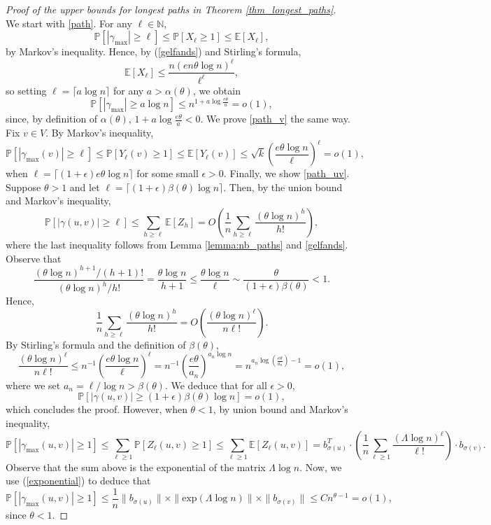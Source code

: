 \documentclass[11pt]{article}
\numberwithin{equation}{section}
\theoremstyle{definition}
\newcommand\bE{{\mathbb E}}
\newcommand\bN{{\mathbb N}}
\newcommand\bP{{\mathbb P}}
\begin{document}
\begin{proof}[Proof of the upper bounds for longest paths in Theorem \ref{thm_longest_paths}]\hfill \\
We start with \ref{path}. For any $\ell \in \bN$,
$$\bP[|\gamma_{\max}|\geq \ell] \leq \bP[X_\ell \geq 1] \leq \bE[X_\ell], $$
by Markov's inequality. Hence, by (\ref{gelfands}) and Stirling's formula,
$$\bE[X_\ell] \leq \frac{n(en \theta\log n)^\ell}{\ell^\ell}, $$
so setting $\ell = \lceil a \log n\rceil$ for any $a > \alpha(\theta)$, we obtain
$$\bP[|\gamma_{\max}|\geq a \log n] \leq n^{1+a\log \frac{e\theta}{a}}= o(1), $$
since, by definition of $\alpha(\theta)$, $1+a\log\frac{e\theta}{a}<0 $. We prove \ref{path_v} the same way. Fix $v \in V$. By Markov's inequality,
$$\bP[|\gamma_{\max}(v)|\geq \ell] \leq \bP[Y_\ell(v) \geq 1] \leq \bE[Y_\ell(v)] \leq \sqrt{k} \left(\frac{e\theta\log n}{\ell}\right)^\ell = o(1),$$
when $\ell = \lceil (1+\epsilon)e\theta\log n \rceil$ for some small $\epsilon > 0$. Finally, we show \ref{path_uv}. Suppose $\theta > 1$ and let $\ell = \lceil (1+\epsilon)\beta(\theta)\log n \rceil$. Then, by the union bound and Markov's inequality,
$$\bP[|\gamma(u,v)|\geq \ell] \leq \sum_{h\geq \ell} \bE[Z_h] = O\left( \frac{1}{n}\sum_{h\geq \ell} \frac{(\theta \log n)^h}{h!} \right), $$
where the last inequality follows from Lemma \ref{lemma:nb_paths} and \eqref{gelfands}. Observe that
$$\frac{(\theta\log n)^{h+1}/(h+1)!}{(\theta\log n)^h/h!} = \frac{\theta\log n}{h+1} \leq \frac{\theta\log n}{\ell}\sim\frac{\theta}{(1+\epsilon)\beta(\theta)}<1. $$
Hence,
$$\frac{1}{n}\sum_{h\geq \ell} \frac{(\theta \log n)^h}{h!} = O\left( \frac{(\theta \log n)^\ell}{n \ell!} \right) . $$
By Stirling's formula and the definition of $\beta(\theta)$,
$$\frac{(\theta \log n)^\ell}{n \ell!} \leq n^{-1}\left(\frac{e\theta \log n }{\ell} \right)^\ell = n^{-1} \left(\frac{e\theta}{a_n} \right)^{a_n \log n} = n^{a_n\log\left(\frac{e\theta}{a_n}\right)-1} = o(1),  $$
where we set $a_n = \ell / \log n > \beta(\theta)$. We deduce that for all $\epsilon > 0$,
$$\bP[|\gamma(u,v)|\geq (1+\epsilon)\beta(\theta)\log n]=o(1), $$
which concludes the proof. However, when $\theta <1$, by union bound and Markov's inequality,
$$\bP[|\gamma_{\max}(u,v)|\geq 1]\leq \sum_{\ell\geq 1}\bP[Z_\ell(u,v)\geq 1] \leq \sum_{\ell \geq 1} \bE[Z_\ell(u,v)] =  b^T_{\sigma(u)} \cdot \left(\frac{1}{n}\sum_{\ell\geq 1} \frac{(\Lambda \log n)^\ell}{\ell!}  \right) \cdot b_{\sigma(v)}. $$
Observe that the sum above is the exponential of the matrix $\Lambda \log n$. Now, we use (\ref{exponential}) to deduce that
$$\bP[|\gamma_{\max}(u,v)|\geq1] \leq \frac{1}{n}\|b_{\sigma(u)}\|\times\|\textrm{exp}(\Lambda \log n)\|\times\|b_{\sigma(v)}\| \leq Cn^{\theta-1} = o(1),$$
since $\theta < 1$. \end{proof}
\end{document}
